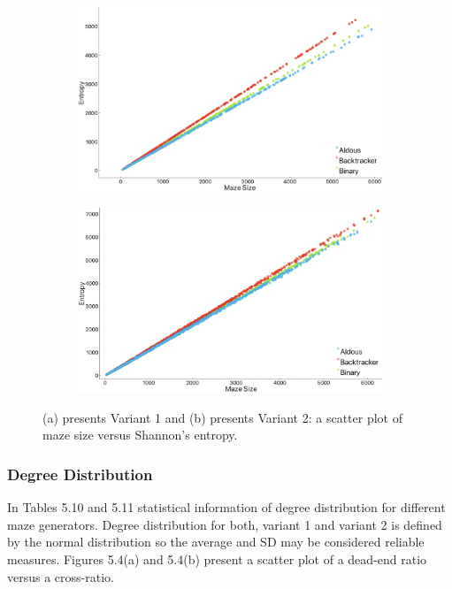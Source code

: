 \begin{figure}[!h]
    \centering
    \begin{subfigure}[!h]{0.7\textwidth}
       \includegraphics[width=0.9\linewidth]{entropy_variant1.png}
       \caption{}
    \end{subfigure}
    \begin{subfigure}[!h]{0.7\textwidth}
       \includegraphics[width=0.9\linewidth]{entropy_variant2.png}
       \caption{}
    \end{subfigure}
    \caption{(a) presents Variant 1 and (b) presents Variant 2: a scatter plot of maze size versus Shannon's entropy.}
    \end{figure}%
 \newline   
\newpage
\subsubsection{Degree Distribution}  
In Tables 5.10 and 5.11 statistical information of degree distribution for different maze generators. Degree distribution for both, variant 1 and variant 2
is defined by the normal distribution so the average and SD may be considered reliable measures.
Figures 5.4(a) and 5.4(b) present a scatter plot of a dead-end ratio versus a cross-ratio.

